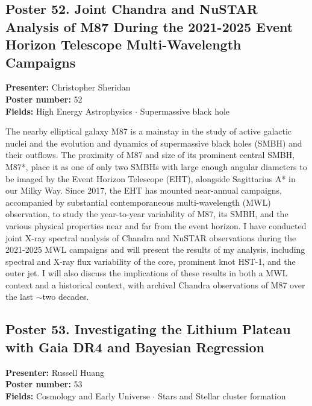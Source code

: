 \hypertarget{poster-abstract-talk-100}{}\label{poster-abstract-page-talk-100}
\subsection*{Poster 52. Joint Chandra and NuSTAR Analysis of M87 During the 2021-2025 Event Horizon Telescope Multi-Wavelength Campaigns}
\textbf{Presenter:} Christopher Sheridan\\
\textbf{Poster number:} 52\\
\textbf{Fields:} High Energy Astrophysics $\cdot$ Supermassive black hole

The nearby elliptical galaxy M87 is a mainstay in the study of active galactic nuclei and the evolution and dynamics of supermassive black holes (SMBH) and their outflows. The proximity of M87 and size of its prominent central SMBH, M87*, place it as one of only two SMBHs with large enough angular diameters to be imaged by the Event Horizon Telescope (EHT), alongside Sagittarius A* in our Milky Way. Since 2017, the EHT has mounted near-annual campaigns, accompanied by substantial contemporaneous multi-wavelength (MWL) observation, to study the year-to-year variability of M87, its SMBH, and the various physical properties near and far from the event horizon. I have conducted joint X-ray spectral analysis of Chandra and NuSTAR observations during the 2021-2025 MWL campaigns and will present the results of my analysis, including spectral and X-ray flux variability of the core, prominent knot HST-1, and the outer jet. I will also discuss the implications of these results in both a MWL context and a historical context, with archival Chandra observations of M87 over the last $\sim$two decades.

\hypertarget{poster-abstract-talk-30}{}\label{poster-abstract-page-talk-30}
\subsection*{Poster 53. Investigating the Lithium Plateau with Gaia DR4 and Bayesian Regression}
\textbf{Presenter:} Russell Huang\\
\textbf{Poster number:} 53\\
\textbf{Fields:} Cosmology and Early Universe $\cdot$ Stars and Stellar cluster formation


